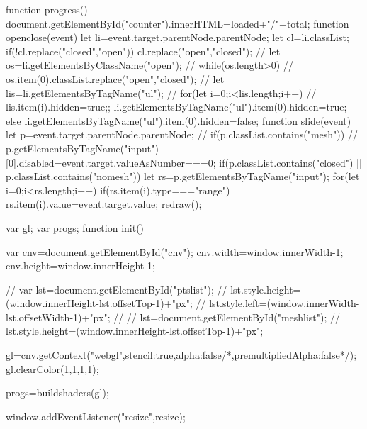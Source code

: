            function progress(){
                document.getElementById("counter").innerHTML=loaded+"/"+total;
            }
            function openclose(event){
                let li=event.target.parentNode.parentNode;
                let cl=li.classList;
                if(!cl.replace("closed","open")){
                    cl.replace("open","closed");
//                    let os=li.getElementsByClassName("open");
//                    while(os.length>0)
//                        os.item(0).classList.replace("open","closed");
//                    let lis=li.getElementsByTagName("ul");
//                    for(let i=0;i<lis.length;i++)
//                        lis.item(i).hidden=true;;
                    li.getElementsByTagName("ul").item(0).hidden=true;
                }else{
                    li.getElementsByTagName("ul").item(0).hidden=false;
                }
            }
            function slide(event){
                let p=event.target.parentNode.parentNode;
//                if(p.classList.contains("mesh"))
//                    p.getElementsByTagName("input")[0].disabled=event.target.valueAsNumber===0;
                if(p.classList.contains("closed") || p.classList.contains("nomesh")){
                    let rs=p.getElementsByTagName("input");
                    for(let i=0;i<rs.length;i++)
                        if(rs.item(i).type==="range")
                            rs.item(i).value=event.target.value;
                }
                redraw();
            }
            
            var gl;
            var progs;
            function init(){
                var cnv=document.getElementById("cnv");
                cnv.width=window.innerWidth-1;
                cnv.height=window.innerHeight-1;
                
//                var lst=document.getElementById("ptslist");
//                lst.style.height=(window.innerHeight-lst.offsetTop-1)+"px";
//                lst.style.left=(window.innerWidth-lst.offsetWidth-1)+"px";
//                
//                lst=document.getElementById("meshlist");
//                lst.style.height=(window.innerHeight-lst.offsetTop-1)+"px";
        
                gl=cnv.getContext("webgl",{stencil:true,alpha:false/*,premultipliedAlpha:false*/});
                gl.clearColor(1,1,1,1);

                progs=buildshaders(gl);
                
                window.addEventListener("resize",resize);
            }

